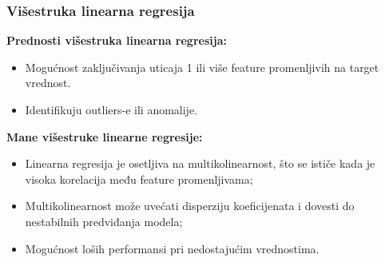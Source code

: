 \documentclass[fontsize=12bp, paper=a4]{scrarticle}
\begin{document}
\subsubsection{Višestruka linearna regresija}
\textbf{Prednosti višestruka linearna regresija:\cite{mlr}} 
\begin{itemize}
    \item Mogućnost zaključivanja uticaja 1 ili više feature promenljivih na target vrednost. 
    
    \item Identifikuju outliers-e ili anomalije.
\end{itemize}
\textbf{Mane višestruke linearne regresije:}
   
    
\begin{itemize}
    \item Linearna regresija je osetljiva na multikolinearnost, što se ističe kada je visoka korelacija među feature promenljivama;

    \item Multikolinearnost može uvećati disperziju koeficijenata i dovesti do nestabilnih predviđanja modela;
    \item Mogućnost loših performansi pri nedostajućim vrednostima.

\end{itemize}

\end{document}
